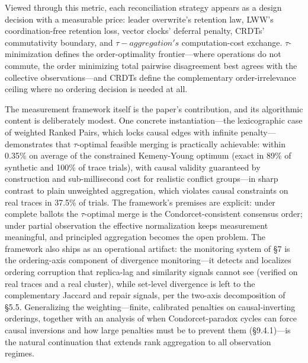 \documentclass[10pt,twocolumn]{article}
\begin{document}
Viewed through this metric, each reconciliation strategy appears as a design decision with a measurable price: leader overwrite's retention law, LWW's coordination-free retention loss, vector clocks' deferral penalty, CRDTs' commutativity boundary, and $\tau-aggregation's$ computation-cost exchange. $\tau$-minimization defines the order-optimality frontier—where operations do not commute, the order minimizing total pairwise disagreement best agrees with the collective observations—and CRDTs define the complementary order-irrelevance ceiling where no ordering decision is needed at all.

The measurement framework itself is the paper's contribution, and its algorithmic content is deliberately modest. One concrete instantiation—the lexicographic case of weighted Ranked Pairs, which locks causal edges with infinite penalty—demonstrates that $\tau$-optimal feasible merging is practically achievable: within 0.35\% on average of the constrained Kemeny-Young optimum (exact in 89\% of synthetic and 100\% of trace trials), with causal validity guaranteed by construction and sub-millisecond cost for realistic conflict groups—in sharp contrast to plain unweighted aggregation, which violates causal constraints on real traces in 37.5\% of trials. The framework's premises are explicit: under complete ballots the $\tau$-optimal merge is the Condorcet-consistent consensus order; under partial observation the effective normalization keeps measurement meaningful, and principled aggregation becomes the open problem. The framework also ships as an operational artifact: the monitoring system of §7 is the ordering-axis component of divergence monitoring—it detects and localizes ordering corruption that replica-lag and similarity signals cannot see (verified on real traces and a real cluster), while set-level divergence is left to the complementary Jaccard and repair signals, per the two-axis decomposition of §5.5. Generalizing the weighting—finite, calibrated penalties on causal-inverting orderings, together with an analysis of when Condorcet-paradox cycles can force causal inversions and how large penalties must be to prevent them (§9.4.1)—is the natural continuation that extends rank aggregation to all observation regimes.
\end{document}

